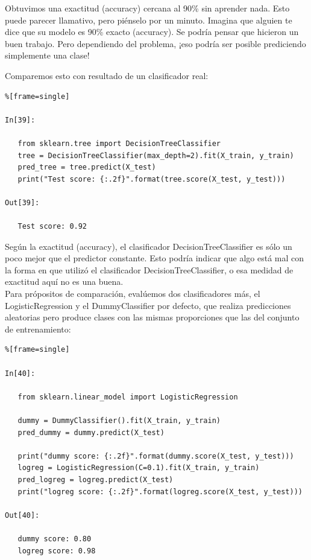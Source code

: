 {Obtuvimos una  exactitud (accuracy) cercana al 90\% sin aprender nada. Esto puede parecer llamativo, pero piénselo por un minuto. Imagina que alguien te dice que su modelo es 90\%  exacto (accuracy). Se podría pensar que hicieron un  buen trabajo. Pero dependiendo del problema, ¡eso podría ser posible prediciendo  simplemente  una clase! 

Comparemos  esto   con resultado de un clasificador real:

\begin{lstlisting}%[frame=single]

In[39]:

   from sklearn.tree import DecisionTreeClassifier
   tree = DecisionTreeClassifier(max_depth=2).fit(X_train, y_train)
   pred_tree = tree.predict(X_test)
   print("Test score: {:.2f}".format(tree.score(X_test, y_test)))

Out[39]:
   
   Test score: 0.92

\end{lstlisting}



Según la  exactitud (accuracy), el clasificador {\ttfamily DecisionTreeClassifier} es sólo un poco mejor que el predictor constante. Esto podría indicar que algo está mal con la forma en que
utilizó el clasificador  {\ttfamily DecisionTreeClassifier}, o esa medidad de exactitud aquí no es una buena.\\


Para própositos  de comparación, evalúemos dos clasificadores más, el {\ttfamily LogisticRegression}
y el {\ttfamily DummyClassifier} por defecto, que realiza predicciones aleatorias pero produce
clases con las mismas proporciones que las del conjunto de entrenamiento:


\begin{lstlisting}%[frame=single]

In[40]:
   
   from sklearn.linear_model import LogisticRegression
   
   dummy = DummyClassifier().fit(X_train, y_train)
   pred_dummy = dummy.predict(X_test)
   
   print("dummy score: {:.2f}".format(dummy.score(X_test, y_test)))
   logreg = LogisticRegression(C=0.1).fit(X_train, y_train)
   pred_logreg = logreg.predict(X_test)
   print("logreg score: {:.2f}".format(logreg.score(X_test, y_test)))

Out[40]:

   dummy score: 0.80
   logreg score: 0.98
   

\end{lstlisting}}
